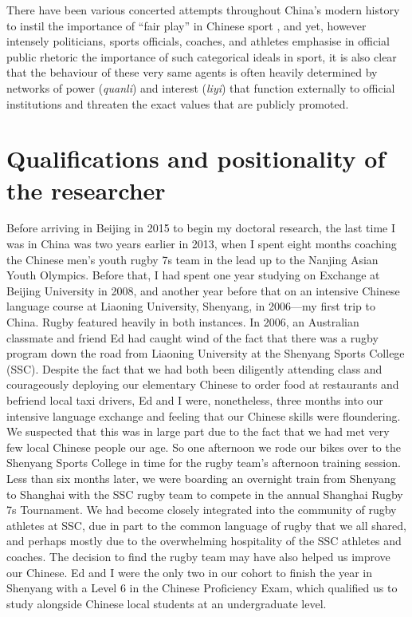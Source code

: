{There have been various concerted attempts throughout China's modern history to instil the importance of ``fair play'' in Chinese sport \citep{Morris2004,Brownell1995,Brownell2008}, and yet, however intensely politicians, sports officials, coaches, and athletes emphasise in official public rhetoric the importance of such categorical ideals in sport, it is also clear that the behaviour of these very same agents is often heavily determined by networks of power (\textit{quanli}) and interest (\textit{liyi}) that function externally to official institutions and threaten the exact values that are publicly promoted.



\section{Qualifications and positionality of the researcher}

  Before arriving in Beijing in 2015 to begin my doctoral research, the last time I was in China was two years earlier in 2013, when I spent eight months coaching the Chinese men's youth rugby 7s team in the lead up to the Nanjing Asian Youth Olympics.  Before that, I had spent one year studying on Exchange at Beijing University in 2008, and another year before that on an intensive Chinese language course at Liaoning University, Shenyang, in 2006---my first trip to China.  Rugby featured heavily in both instances.  In 2006, an Australian classmate and friend Ed had caught wind of the fact that there was a rugby program down the road from Liaoning University at the Shenyang Sports College (SSC).  Despite the fact that we had both been diligently attending class and courageously deploying our elementary Chinese to order food at restaurants and befriend local taxi drivers, Ed and I were, nonetheless, three months into our intensive language exchange and feeling that our Chinese skills were floundering.  We suspected that this was in large part due to the fact that we had met very few local Chinese people our age.  So one afternoon we rode our bikes over to the Shenyang Sports College in time for the rugby team's afternoon training session.  Less than six months later, we were boarding an overnight train from Shenyang to Shanghai with the SSC rugby team to compete in the annual Shanghai Rugby 7s Tournament.  We had become closely integrated into the community of rugby athletes at SSC, due in part to the common language of rugby that we all shared, and perhaps mostly due to the overwhelming hospitality of the SSC athletes and coaches.  The decision to find the rugby team may have also helped us improve our Chinese. Ed and I were the only two in our cohort to finish the year in Shenyang with a Level 6 in the Chinese Proficiency Exam, which qualified us to study alongside Chinese local students at an undergraduate level.

}
